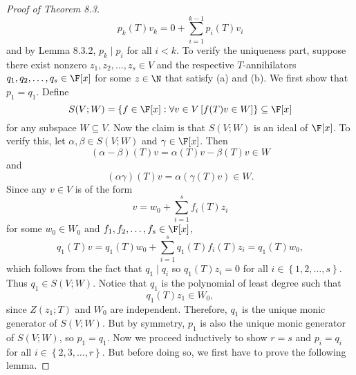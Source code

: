 \documentclass[linearalgebra]{subfiles}
\begin{document}
\begin{proof}[Proof of Theorem 8.3]
        \begin{equation*}
            p_k(T)v_k = 0 + \sum^{k-1}_{i=1} p_i(T)v_i
        \end{equation*}
        and by Lemma 8.3.2, $p_k\mid p_i$ for all $i<k$. To verify the uniqueness part, suppose there exist nonzero $z_1,z_2,\ldots,z_s\in V$ and the respective $T$-annihilators $q_1,q_2,\ldots,q_s\in\F[x]$ for some $z\in\N$ that satisfy (a) and (b). We first show that $p_1=q_1$. Define
        \begin{equation*}
            S(V;W) = \left\lbrace f\in\F[x]:\forall v\in V \left[ f(T)v\in W \right] \right\rbrace \subseteq \F[x] 
        \end{equation*}
        for any subspace $W\subseteq V$. Now the claim is that $S(V;W)$ is an ideal of $\F[x]$. To verify this, let $\alpha,\beta\in S(V;W)$ and $\gamma\in\F[x]$. Then
        \begin{equation*}
            \left( \alpha-\beta \right) (T)v = \alpha(T)v - \beta(T)v\in W
        \end{equation*}
        and
        \begin{equation*}
            \left( \alpha\gamma \right) (T)v = \alpha\left( \gamma(T)v \right) \in W.
        \end{equation*}
        Since any $v\in V$ is of the form
        \begin{equation*}
            v = w_0 + \sum^{s}_{i=1} f_i(T)z_i
        \end{equation*}
        for some $w_0\in W_0$ and $f_1,f_2,\ldots,f_s\in\F[x]$,
        \begin{equation*}
            q_1(T)v = q_1(T)w_0 + \sum^{s}_{i=1} q_1(T)f_i(T)z_i = q_1(T)w_0,
        \end{equation*}
        which follows from the fact that $q_1\mid q_i$ so $q_1(T)z_i = 0$ for all $i\in \left\lbrace 1,2,\ldots,s \right\rbrace$. Thus $q_1\in S\left( V;W \right)$. Notice that $q_1$ is the polynomial of least degree such that
        \begin{equation*}
            q_1(T)z_1\in W_0,
        \end{equation*}
        since $Z\left( z_1;T \right)$ and $W_0$ are independent. Therefore, $q_1$ is the unique monic generator of $S\left( V;W \right)$. But by symmetry, $p_1$ is also the unique monic generator of $S\left( V;W \right) $, so $p_1=q_1$. Now we proceed inductively to show $r=s$ and $p_i=q_i$ for all $i\in\left\lbrace 2,3,\ldots,r \right\rbrace $. But before doing so, we first have to prove the following lemma. \suppressqedsym
    \end{proof}
\end{document}
